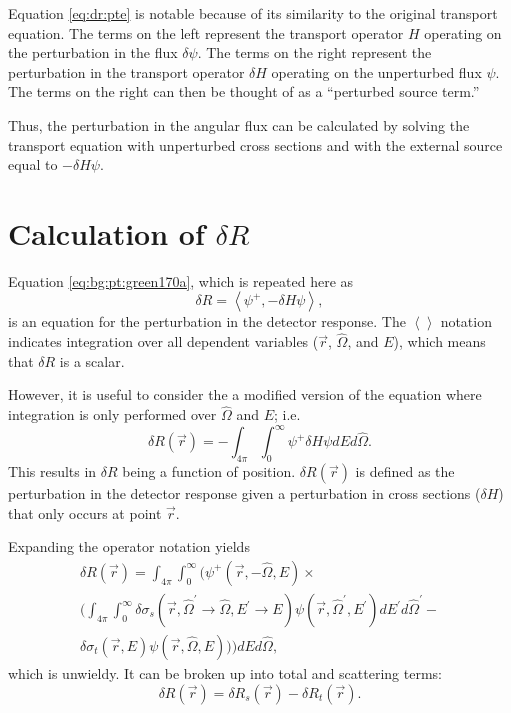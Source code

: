 Equation \ref{eq:dr:pte} is notable because of its similarity to the original transport equation.
The terms on the left represent the transport operator $H$ operating on the perturbation in the flux $\delta\psi$.
The terms on the right represent the perturbation in the transport operator $\delta H$ operating on the unperturbed flux $\psi$.
The terms on the right can then be thought of as a ``perturbed source term.''

Thus, the perturbation in the angular flux can be calculated by solving the transport equation with unperturbed cross sections and with the external source equal to $-\delta H\psi$.

\section{Calculation of $\delta R$}
\label{sec:dr:dr}

Equation \ref{eq:bg:pt:green170a}, which is repeated here as
\begin{equation}\label{eq:dr:dr_operator}
  \delta R = \left<\psi^+,-\delta H\psi\right>,
\end{equation}
is an equation for the perturbation in the detector response.
The $\left<\right>$ notation indicates integration over all dependent variables ($\vec{r}$, $\hat{\Omega}$, and $E$), which means that $\delta R$ is a scalar.

However, it is useful to consider the a modified version of the equation where integration is only performed over $\hat{\Omega}$ and $E$; i.e.
\begin{equation}\label{eq:dr:dr_pos}
  \delta R\left(\vec{r}\right) =
  -\int_{4\pi}\int_0^\infty\psi^+\delta H\psi dEd\hat{\Omega}.
\end{equation}
This results in $\delta R$ being a function of position.
$\delta R\left(\vec{r}\right)$ is defined as the perturbation in the detector response given a perturbation in cross sections ($\delta H$) that only occurs at point $\vec{r}$.

Expanding the operator notation yields
\begin{multline}\label{eq:dr:dr_pos_expand}
  \delta R\left(\vec{r}\right) =
  \int_{4\pi}\int_0^\infty\Biggl(\psi^+\left(\vec{r},-\hat{\Omega},E\right) \times \\
  \Biggl(\int_{4\pi}\int_0^\infty\delta\sigma_s\left(\vec{r},\hat{\Omega}^\prime\rightarrow\hat{\Omega},E^\prime\rightarrow E\right)\psi\left(\vec{r},\hat{\Omega}^\prime,E^\prime\right)dE^\prime d\hat{\Omega}^\prime - \\
  \delta\sigma_t\left(\vec{r},E\right)\psi\left(\vec{r},\hat{\Omega},E\right)\Biggr)\Biggr)dEd\hat{\Omega},
\end{multline}
which is unwieldy.
It can be broken up into total and scattering terms:
\begin{equation}\label{eq:dr:dr_terms}
  \delta R\left(\vec{r}\right) =
  \delta R_s\left(\vec{r}\right) -
  \delta R_t\left(\vec{r}\right).
\end{equation}

